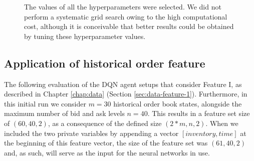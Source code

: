 \begin{figure}[H]
    \centering
    \caption{The values of all the hyperparameters were selected. We did not perform a systematic grid search owing to the high computational cost, although it is conceivable that better results could be obtained by tuning these hyperparameter values.}
    \label{fig:eval-dqn-hyperparameters}
\end{figure}

\subsection{Application of historical order feature}

The following evaluation of the DQN agent setups that consider Feature I, as described in Chapter \ref{chap:data} (Section \ref{sec:data-feature-1}).
Furthermore, in this initial run we consider $m=30$ historical order book states, alongside the maximum number of bid and ask levels $n=40$.
This results in a feature set size of $(60, 40, 2)$, as a consequence of the defined size $(2*m, n, 2)$.
When we included the two private variables by appending a vector $[inventory, time]$ at the beginning of this feature vector, the size of the feature set was $(61, 40, 2)$ and, as such, will serve as the input for the neural networks in use.

